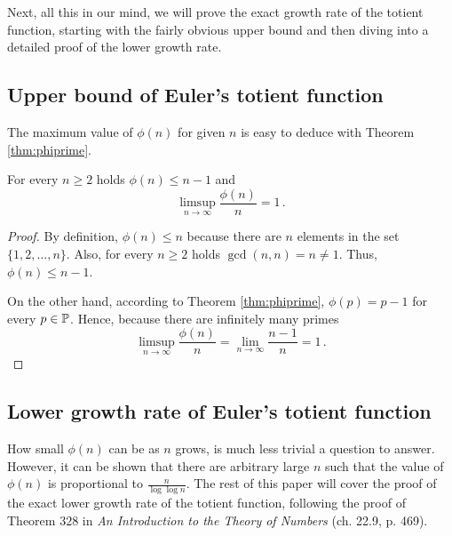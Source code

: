 \documentclass{article}
\begin{document}
Next, all this in our mind, we will prove the exact growth rate of the totient function, starting with the fairly obvious upper bound and then diving into a detailed proof of the lower growth rate.

\subsection{Upper bound of Euler's totient function}

The maximum value of $\phi(n)$ for given $n$ is easy to deduce with Theorem \ref{thm:phiprime}.

\begin{theorem}%
For every $n \geq 2$ holds $\phi(n) \leq n-1$ and
\begin{equation*}
    \limsup_{n \rightarrow \infty}{\frac{\phi(n)}{n}} = 1\,.
\end{equation*}

\begin{proof}

By definition, $\phi(n) \leq n$ because there are $n$ elements in the set $\{1,2,\dots,n\}$. Also, for every $n \geq 2$ holds $\gcd(n,n) = n \neq 1$. Thus, $\phi(n) \leq n-1$.

On the other hand, according to Theorem \ref{thm:phiprime}, $\phi(p) = p-1$ for every $p\in\mathbb{P}$.
Hence, because there are infinitely many primes %
\begin{equation*}
    \limsup_{n\rightarrow\infty}\frac{\phi(n)}{n} = \lim_{n\rightarrow\infty} \frac{n-1}{n} = 1\,.
\end{equation*}

\end{proof}

\end{theorem}

\subsection{Lower growth rate of Euler's totient function}

How small $\phi(n)$ can be as $n$ grows, is much less trivial a question to answer. However, it can be shown that there are arbitrary large $n$ such that the value of $\phi(n)$ is proportional to $\frac{n}{\log\log n}$. The rest of this paper will cover the proof of the exact lower growth rate of the totient function, following the proof of Theorem $328$
in \textit{An Introduction to the Theory of Numbers} \cite{HardyWright} (ch. 22.9, p. 469).
\end{document}
